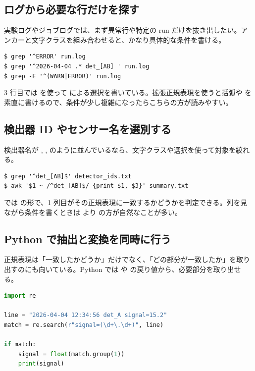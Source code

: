 \subsection{ログから必要な行だけを探す}

実験ログやジョブログでは、まず異常行や特定の run だけを抜き出したい。アンカーと文字クラスを組み合わせると、かなり具体的な条件を書ける。

\begin{lstlisting}[numbers=none, xleftmargin=2\zw]
$ grep '^ERROR' run.log
$ grep '^2026-04-04 .* det_[AB] ' run.log
$ grep -E '^(WARN|ERROR)' run.log
\end{lstlisting}

3 行目では  を使って \code{|} による選択を書いている。拡張正規表現を使うと括弧や \code{+} を素直に書けるので、条件が少し複雑になったらこちらの方が読みやすい。

\subsection{検出器 ID やセンサー名を選別する}

検出器名が , ,  のように並んでいるなら、文字クラスや選択を使って対象を絞れる。

\begin{lstlisting}[numbers=none, xleftmargin=2\zw]
$ grep '^det_[AB]$' detector_ids.txt
$ awk '$1 ~ /^det_[AB]$/ {print $1, $3}' summary.txt
\end{lstlisting}

 では  の形で、1 列目がその正規表現に一致するかどうかを判定できる。列を見ながら条件を書くときは  より  の方が自然なことが多い。

\subsection{Python で抽出と変換を同時に行う}

正規表現は「一致したかどうか」だけでなく、「どの部分が一致したか」を取り出すのにも向いている。Python では  や  の戻り値から、必要部分を取り出せる。

\begin{lstlisting}[language=Python]
import re

line = "2026-04-04 12:34:56 det_A signal=15.2"
match = re.search(r"signal=(\d+\.\d+)", line)

if match:
    signal = float(match.group(1))
    print(signal)
\end{lstlisting}

